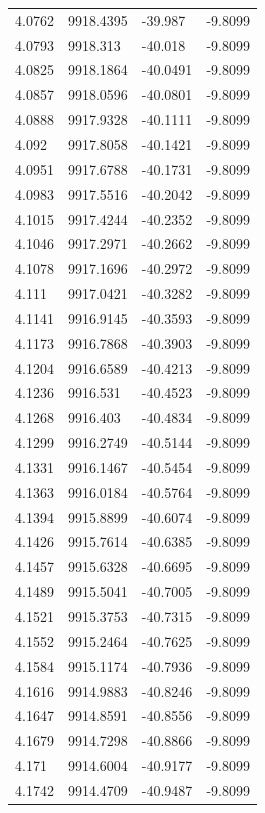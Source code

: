 \begin{table}[H]
\begin{tabular}{llll}
4.0762 & 9918.4395 & -39.987 & -9.8099 \\
4.0793 & 9918.313 & -40.018 & -9.8099 \\
4.0825 & 9918.1864 & -40.0491 & -9.8099 \\
4.0857 & 9918.0596 & -40.0801 & -9.8099 \\
4.0888 & 9917.9328 & -40.1111 & -9.8099 \\
4.092 & 9917.8058 & -40.1421 & -9.8099 \\
4.0951 & 9917.6788 & -40.1731 & -9.8099 \\
4.0983 & 9917.5516 & -40.2042 & -9.8099 \\
4.1015 & 9917.4244 & -40.2352 & -9.8099 \\
4.1046 & 9917.2971 & -40.2662 & -9.8099 \\
4.1078 & 9917.1696 & -40.2972 & -9.8099 \\
4.111 & 9917.0421 & -40.3282 & -9.8099 \\
4.1141 & 9916.9145 & -40.3593 & -9.8099 \\
4.1173 & 9916.7868 & -40.3903 & -9.8099 \\
4.1204 & 9916.6589 & -40.4213 & -9.8099 \\
4.1236 & 9916.531 & -40.4523 & -9.8099 \\
4.1268 & 9916.403 & -40.4834 & -9.8099 \\
4.1299 & 9916.2749 & -40.5144 & -9.8099 \\
4.1331 & 9916.1467 & -40.5454 & -9.8099 \\
4.1363 & 9916.0184 & -40.5764 & -9.8099 \\
4.1394 & 9915.8899 & -40.6074 & -9.8099 \\
4.1426 & 9915.7614 & -40.6385 & -9.8099 \\
4.1457 & 9915.6328 & -40.6695 & -9.8099 \\
4.1489 & 9915.5041 & -40.7005 & -9.8099 \\
4.1521 & 9915.3753 & -40.7315 & -9.8099 \\
4.1552 & 9915.2464 & -40.7625 & -9.8099 \\
4.1584 & 9915.1174 & -40.7936 & -9.8099 \\
4.1616 & 9914.9883 & -40.8246 & -9.8099 \\
4.1647 & 9914.8591 & -40.8556 & -9.8099 \\
4.1679 & 9914.7298 & -40.8866 & -9.8099 \\
4.171 & 9914.6004 & -40.9177 & -9.8099 \\
4.1742 & 9914.4709 & -40.9487 & -9.8099 \\

\end{tabular}
\end{table}
